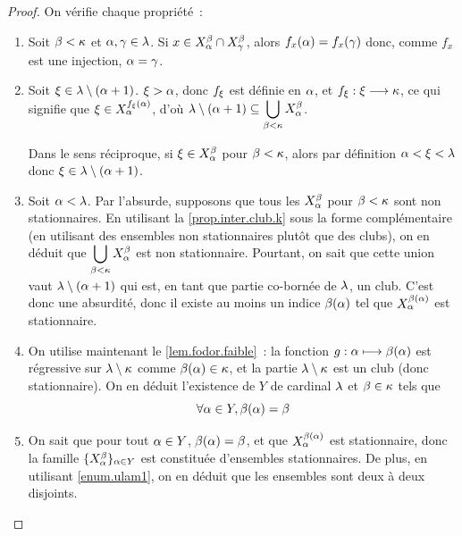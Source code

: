 \begin{proof}
  On vérifie chaque propriété~:
  \begin{enumerate}[label=(\roman*)]
  \item Soit $\beta < \kappa$ et $\alpha, \gamma \in\lambda$. Si
    $x\in X_{\alpha}^{\beta} \cap X_{\gamma}^{\beta}$, alors
    $f_x(\alpha) = f_x(\gamma)$ donc, comme $f_x$ est une injection,
    $\alpha = \gamma$.
  \item Soit $\xi \in \lambda \setminus (\alpha + 1)$.
    $\xi > \alpha$, donc $f_\xi$ est définie en $\alpha$, et
    $f_\xi : \displaystyle \xi \longrightarrow \kappa$, ce qui signifie que
    $\xi \in X_{\alpha}^{f_\xi(\alpha)}$, d'où
    $\displaystyle
    \lambda\setminus(\alpha+1)\subseteq\bigcup_{\beta < \kappa} X_{\alpha}^{\beta}$.

    Dans le sens réciproque, si $\xi \in X_{\alpha}^{\beta}$ pour
    $\beta <\kappa$, alors par définition $\alpha < \xi < \lambda$ donc
    $\xi \in \lambda\setminus(\alpha + 1)$.
  \item Soit $\alpha < \lambda$. Par l'absurde, supposons que tous les
    $X_{\alpha}^{\beta}$ pour $\beta < \kappa$ sont non stationnaires. En
    utilisant la \cref{prop.inter.club.k} sous la forme complémentaire (en
    utilisant des ensembles non stationnaires plutôt que des clubs), on en
    déduit que
    $\displaystyle\bigcup_{\beta < \kappa} X_{\alpha}^{\beta}$ est non stationnaire.
    Pourtant, on sait que cette union vaut $\lambda \setminus(\alpha + 1)$ qui
    est, en tant que partie co-bornée de $\lambda$, un club. C'est donc une
    absurdité, donc il existe au moins un indice $\beta(\alpha)$ tel que
    $X_{\alpha}^{\beta(\alpha)}$ est stationnaire.
  \item On utilise maintenant le \cref{lem.fodor.faible}~: la fonction
    $g : \alpha \longmapsto \beta(\alpha)$ est régressive sur
    $\lambda\setminus\kappa$ comme $\beta(\alpha) \in \kappa$, et la partie
    $\lambda\setminus\kappa$ est un club (donc stationnaire). On en déduit
    l'existence de $Y$ de cardinal $\lambda$ et $\beta \in \kappa$ tels que
    \[\forall \alpha \in Y, \beta(\alpha) = \beta\]
  \item On sait que pour tout $\alpha \in Y$, $\beta(\alpha) = \beta$, et
    que $X_{\alpha}^{\beta(\alpha)}$ est stationnaire, donc la famille
    $\{X_{\alpha}^{\beta}\}_{\alpha\in Y}$ est constituée d'ensembles stationnaires.
    De plus, en utilisant \ref{enum.ulam1}, on en déduit que les ensembles sont
    deux à deux disjoints.\qedhere
  \end{enumerate}
\end{proof}

